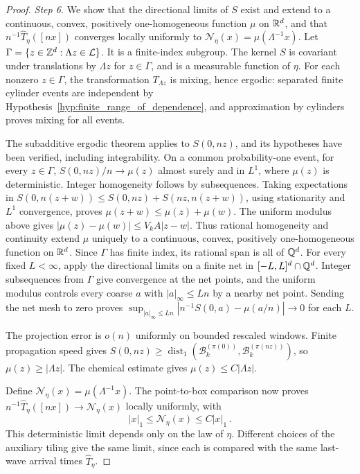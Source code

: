 \documentclass[12pt]{amsart}
\begin{document}
\begin{proof}
\emph{Step 6.} We show that the directional limits of $S$ exist and extend to a continuous, convex, positively one-homogeneous function $\mu$ on $\mathbb{R}^d$, and that $n^{-1}\hat T_\eta([nx])$ converges locally uniformly to $\mathcal N_\eta(x)=\mu(\Lambda^{-1}x)$. Let $\Gamma=\{z\in\mathbb{Z}^d:\Lambda z\in\mathcal L\}$. It is a finite-index subgroup. The kernel $S$ is covariant under translations by $\Lambda z$ for $z\in\Gamma$, and is a measurable function of $\eta$. For each nonzero $z\in\Gamma$, the transformation $T_{\Lambda z}$ is mixing, hence ergodic: separated finite cylinder events are independent by Hypothesis~\ref{hyp:finite_range_of_dependence}, and approximation by cylinders proves mixing for all events.

The subadditive ergodic theorem applies to $S(0,nz)$, and its hypotheses have been verified, including integrability. On a common probability-one event, for every $z\in\Gamma$, $S(0,nz)/n\to\mu(z)$ almost surely and in $L^1$, where $\mu(z)$ is deterministic. Integer homogeneity follows by subsequences. Taking expectations in $S(0,n(z+w))\leq S(0,nz)+S(nz,n(z+w))$, using stationarity and $L^1$ convergence, proves $\mu(z+w)\leq\mu(z)+\mu(w)$. The uniform modulus above gives $|\mu(z)-\mu(w)|\leq V_kA|z-w|$. Thus rational homogeneity and continuity extend $\mu$ uniquely to a continuous, convex, positively one-homogeneous function on $\mathbb{R}^d$. Since $\Gamma$ has finite index, its rational span is all of $\mathbb{Q}^d$. For every fixed $L<\infty$, apply the directional limits on a finite net in $[-L,L]^d\cap\mathbb{Q}^d$. Integer subsequences from $\Gamma$ give convergence at the net points, and the uniform modulus controls every coarse $a$ with $|a|_\infty\leq Ln$ by a nearby net point. Sending the net mesh to zero proves $\sup_{|a|_\infty\leq Ln}|n^{-1}S(0,a)-\mu(a/n)|\to0$ for each $L$.

The projection error is $o(n)$ uniformly on bounded rescaled windows. Finite propagation speed gives $S(0,nz)\geq\operatorname{dist}_1(\mathcal B^{(\pi(0))}_k,\mathcal B^{(\pi(nz))}_k)$, so $\mu(z)\geq|\Lambda z|$. The chemical estimate gives $\mu(z)\leq C|\Lambda z|$.

Define $\mathcal N_\eta(x)=\mu(\Lambda^{-1}x)$. The point-to-box comparison now proves $n^{-1}\hat T_\eta([nx])\to\mathcal N_\eta(x)$ locally uniformly, with
\begin{equation*}
 |x|_1\leq\mathcal N_\eta(x)\leq C|x|_1\,.
\end{equation*}
This deterministic limit depends only on the law of $\eta$. Different choices of the auxiliary tiling give the same limit, since each is compared with the same last-wave arrival times $\hat T_\eta$.
\end{proof}
\end{document}
